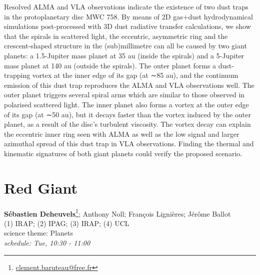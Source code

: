 \documentclass[11pt,twoside, openright]{report}
\begin{document}
 
    
\vspace{3 mm}

      Resolved ALMA and VLA observations indicate the existence of two dust traps in the protoplanetary disc MWC 758. By means of 2D gas+dust hydrodynamical simulations post-processed with 3D dust radiative transfer calculations, we show that the spirals in scattered light, the eccentric, asymmetric ring and the crescent-shaped structure in the (sub)millimetre can all be caused by two giant planets: a 1.5-Jupiter mass planet at 35 au (inside the spirals) and a 5-Jupiter mass planet at 140 au (outside the spirals). The outer planet forms a dust-trapping vortex at the inner edge of its gap (at ∼85 au), and the continuum emission of this dust trap reproduces the ALMA and VLA observations well. The outer planet triggers several spiral arms which are similar to those observed in polarised scattered light. The inner planet also forms a vortex at the outer edge of its gap (at ∼50 au), but it decays faster than the vortex induced by the outer planet, as a result of the disc’s turbulent viscosity. The vortex decay can explain the eccentric inner ring seen with ALMA as well as the low signal and larger azimuthal spread of this dust trap in VLA observations. Finding the thermal and kinematic signatures of both giant planets could verify the proposed scenario. 

        
          \section[Sébastien Deheuvels: Red Giant] { Red Giant }
\textbf{ Sébastien Deheuvels}\footnote{\href{mailto: clement.baruteau@free.fr}{clement.baruteau@free.fr} };  Anthony Noll;  François Lignières;  Jérôme Ballot\\
    (1) IRAP; (2)  IPAG; (3)  IRAP; (4)  UCL\\


    
    \noindent
    science theme: Planets\\
    \emph{schedule: Tue, 10:30 - 11:00  }\\


 
    
\vspace{3 mm}
\end{document}
